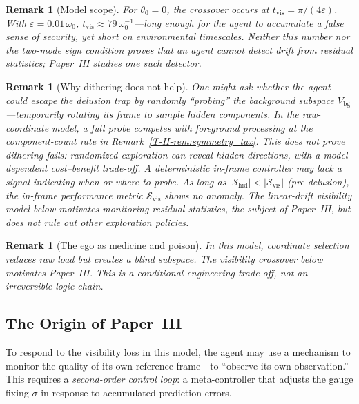 \documentclass[12pt,a4paper,openany]{book}
\newtheorem{remark}[theorem]{Remark}
\begin{document}
\begin{remark}[Model scope]
\label{T-II-rem:linear_drift}
For $\theta_0=0$, the crossover occurs at
$t_{\mathrm{vis}} = \pi/(4\varepsilon)$.
With $\varepsilon = 0.01\,\omega_0$,
$t_{\mathrm{vis}} \approx 79\,\omega_0^{-1}$---long
enough for the agent to accumulate a false sense of
security, yet short on environmental timescales.
Neither this number nor the two-mode sign condition proves that an
agent cannot detect drift from residual statistics; Paper~III studies
one such detector.
\end{remark}

\begin{remark}[Why dithering does not help]
\label{T-II-rem:dithering}
One might ask whether the agent could escape the delusion
trap by randomly ``probing'' the background subspace
$V_{\mathrm{bg}}$---temporarily rotating its frame to
sample hidden components.
In the raw-coordinate model, a full probe competes with foreground
processing at the component-count rate in
Remark~\ref{T-II-rem:symmetry_tax}.  This does not prove dithering fails:
randomized exploration can reveal hidden directions, with a
model-dependent cost--benefit trade-off.  A deterministic in-frame
controller may lack a signal indicating when or where to probe.
As long as $|\mathcal{S}_{\mathrm{hid}}|
< |\mathcal{S}_{\mathrm{vis}}|$ (pre-delusion), the
in-frame performance metric $\mathcal{S}_{\mathrm{vis}}$
shows no anomaly.
The linear-drift visibility model below motivates monitoring residual
statistics, the subject of Paper~III, but does not rule out other
exploration policies.
\end{remark}

\begin{remark}[The ego as medicine and poison]
\label{T-II-rem:medicine_poison}
In this model, coordinate selection reduces raw load but creates a blind
subspace.  The visibility crossover below motivates Paper~III.  This is
a conditional engineering trade-off, not an irreversible logic chain.
\end{remark}

\subsection{The Origin of Paper~III}
\label{T-II-subsec:paper3}

To respond to the visibility loss in this model, the agent may use a mechanism
to monitor the quality of its own reference frame---to
``observe its own observation.''
This requires a \emph{second-order control loop}: a
meta-controller that adjusts the gauge fixing $\sigma$ in
response to accumulated prediction errors.
\end{document}
